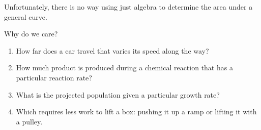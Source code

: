 \documentclass[letterpaper,12pt,fleqn]{article}
\begin{document}
Unfortunately, there is no way using just algebra to determine the area under a general curve.

Why do we care?
\begin{enumerate}
\item How far does a car travel that varies its speed along the way?
\item How much product is produced during a chemical reaction that has a particular reaction rate?
\item What is the projected population given a particular growth rate?
\item Which requires less work to lift a box: pushing it up a ramp or lifting it with a pulley.
\end{enumerate}
\end{document}

